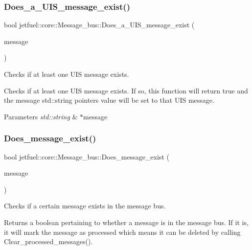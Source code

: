 \subsubsection{\texorpdfstring{Does\+\_\+a\+\_\+\+U\+I\+S\+\_\+message\+\_\+exist()}{Does\_a\_UIS\_message\_exist()}}
{\footnotesize\ttfamily bool jetfuel\+::core\+::\+Message\+\_\+bus\+::\+Does\+\_\+a\+\_\+\+U\+I\+S\+\_\+message\+\_\+exist (\begin{DoxyParamCaption}\item[{std\+::string $\ast$}]{message }\end{DoxyParamCaption})}



Checks if at least one U\+IS message exists. 

Checks if at least one U\+IS message exists. If so, this function will return true and the message std\+::string pointer\textquotesingle{}s value will be set to that U\+IS message.


\begin{DoxyParams}{Parameters}
{\em std\+::string} & $\ast$message \\
\hline
\end{DoxyParams}
\mbox{\label{classjetfuel_1_1core_1_1Message__bus_a9bbbbea3cd97a8f8253e08b700dbd05d}} 
\subsubsection{\texorpdfstring{Does\+\_\+message\+\_\+exist()}{Does\_message\_exist()}}
{\footnotesize\ttfamily bool jetfuel\+::core\+::\+Message\+\_\+bus\+::\+Does\+\_\+message\+\_\+exist (\begin{DoxyParamCaption}\item[{const std\+::string}]{message }\end{DoxyParamCaption})}



Checks if a certain message exists in the message bus. 

Returns a boolean pertaining to whether a message is in the message bus. If it is, it will mark the message as processed which means it can be deleted by calling Clear\+\_\+processed\+\_\+messages().


